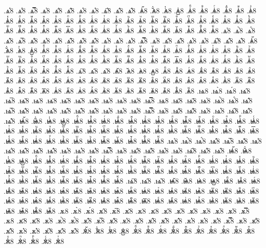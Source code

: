 {.ѧ҅̔8
.ѧ҅̾8
.ѧ҅̿8
.ѧ҅͘8
.ѧ҅҃8
.ѧ҅҄8
.ѧ҅҅8
.ѧ҅҆8
.ѧ҅҇8
.ѧ҅᷀8
.ѧ҅᷁8
.ѧ҅᷶8
.ѧ᷷҅8
.ѧ᷸҅8
.ѧ᷹҅8
.ѧ҅ⷠ8
.ѧ҅ⷡ8
.ѧ҅ⷢ8
.ѧ҅ⷣ8
.ѧ҅ⷤ8
.ѧ҅ⷥ8
.ѧ҅ⷦ8
.ѧ҅ⷧ8
.ѧ҅ⷨ8
.ѧ҅ⷩ8
.ѧ҅ⷪ8
.ѧ҅ⷫ8
.ѧ҅ⷬ8
.ѧ҅ⷭ8
.ѧ҅ⷮ8
.ѧ҅ⷯ8
.ѧ҅ⷰ8
.ѧ҅ⷱ8
.ѧ҅ⷲ8
.ѧ҅ⷳ8
.ѧ҅ⷴ8
.ѧ҅ⷵ8
.ѧ҅ⷶ8
.ѧ҅ⷷ8
.ѧ҅ⷸ8
.ѧ҅ⷹ8
.ѧ҅ⷺ8
.ѧ҅ⷻ8
.ѧ҅ⷼ8
.ѧ҅ⷽ8
.ѧ҅ⷾ8
.ѧ҅ⷿ8
.ѧ҅꙯8
.ѧ҅ꙴ8
.ѧ҅ꙵ8
.ѧ҅ꙶ8
.ѧ҅ꙷ8
.ѧ҅ꙸ8
.ѧ҅ꙹ8
.ѧ҅ꙺ8
.ѧ҅ꙻ8
.ѧ҅꙼8
.ѧ҅꙽8
.ѧ҅ꚞ8
.ѧ҅ꚟ8
.ѧ҆8
.ѧ҆̀8
.ѧ҆́8
.ѧ҆̂8
.ѧ҆̅8
.ѧ҆̆8
.ѧ҆̇8
.ѧ҆̈8
.ѧ҆̋8
.ѧ҆̏8
.ѧ҆̑8
.ѧ҆̓8
.ѧ҆̔8
.ѧ҆̾8
.ѧ҆̿8
.ѧ҆͘8
.ѧ҆҃8
.ѧ҆҄8
.ѧ҆҅8
.ѧ҆҆8
.ѧ҆҇8
.ѧ҆᷀8
.ѧ҆᷁8
.ѧ҆᷶8
.ѧ᷷҆8
.ѧ᷸҆8
.ѧ᷹҆8
.ѧ҆ⷠ8
.ѧ҆ⷡ8
.ѧ҆ⷢ8
.ѧ҆ⷣ8
.ѧ҆ⷤ8
.ѧ҆ⷥ8
.ѧ҆ⷦ8
.ѧ҆ⷧ8
.ѧ҆ⷨ8
.ѧ҆ⷩ8
.ѧ҆ⷪ8
.ѧ҆ⷫ8
.ѧ҆ⷬ8
.ѧ҆ⷭ8
.ѧ҆ⷮ8
.ѧ҆ⷯ8
.ѧ҆ⷰ8
.ѧ҆ⷱ8
.ѧ҆ⷲ8
.ѧ҆ⷳ8
.ѧ҆ⷴ8
.ѧ҆ⷵ8
.ѧ҆ⷶ8
.ѧ҆ⷷ8
.ѧ҆ⷸ8
.ѧ҆ⷹ8
.ѧ҆ⷺ8
.ѧ҆ⷻ8
.ѧ҆ⷼ8
.ѧ҆ⷽ8
.ѧ҆ⷾ8
.ѧ҆ⷿ8
.ѧ҆꙯8
.ѧ҆ꙴ8
.ѧ҆ꙵ8
.ѧ҆ꙶ8
.ѧ҆ꙷ8
.ѧ҆ꙸ8
.ѧ҆ꙹ8
.ѧ҆ꙺ8
.ѧ҆ꙻ8
.ѧ҆꙼8
.ѧ҆꙽8
.ѧ҆ꚞ8
.ѧ҆ꚟ8
.ѧ҇8
.ѧ᷀8
.ѧ᷁8
.ѧ᷶8
.ѧ᷷8
.ѧ᷸8
.ѧ᷹8
.ѧⷠ8
.ѧⷡ8
.ѧⷢ8
.ѧⷣ8
.ѧⷤ8
.ѧⷥ8
.ѧⷦ8
.ѧⷧ8
.ѧⷨ8
.ѧⷩ8
.ѧⷪ8
.ѧⷫ8
.ѧⷬ8
.ѧⷭ8
.ѧⷮ8
.ѧⷯ8
.ѧⷰ8
.ѧⷱ8
.ѧⷲ8
.ѧⷳ8
.ѧⷴ8
.ѧⷵ8
.ѧⷶ8
.ѧⷷ8
.ѧⷸ8
.ѧⷹ8
.ѧⷺ8
.ѧⷻ8
.ѧⷼ8
.ѧⷽ8
.ѧⷾ8
.ѧⷿ8
.ѧ꙯8
.ѧꙴ8
.ѧꙵ8
.ѧꙶ8
.ѧꙷ8
.ѧꙸ8
.ѧꙹ8
.ѧꙺ8
.ѧꙻ8
.ѧ꙼8
.ѧ꙽8
.ѧꚞ8
.ѧꚟ8
.ѩ8
.ѩ̀8
.ѩ́8
.ѩ̂8
.ѩ̅8
.ѩ̆8
.ѩ̇8
.ѩ̈8
.ѩ̋8
.ѩ̏8
.ѩ̑8
.ѩ̓8
.ѩ̔8
.ѩ̾8
.ѩ̿8
.ѩ͘8
.ѩ҃8
.ѩ҄8
.ѩ҅8
.ѩ҅̀8
.ѩ҅́8
.ѩ҅̂8
.ѩ҅̅8
.ѩ҅̆8
.ѩ҅̇8
.ѩ҅̈8
.ѩ҅̋8
.ѩ҅̏8
.ѩ҅̑8
.ѩ҅̓8
.ѩ҅̔8
.ѩ҅̾8
.ѩ҅̿8
.ѩ҅͘8
.ѩ҅҃8
.ѩ҅҄8
.ѩ҅҅8
.ѩ҅҆8
.ѩ҅҇8
.ѩ҅᷀8
.ѩ҅᷁8
.ѩ҅᷶8
.ѩ᷷҅8
.ѩ᷸҅8
.ѩ᷹҅8
.ѩ҅ⷠ8
.ѩ҅ⷡ8
.ѩ҅ⷢ8
.ѩ҅ⷣ8
.ѩ҅ⷤ8
.ѩ҅ⷥ8
.ѩ҅ⷦ8
.ѩ҅ⷧ8
.ѩ҅ⷨ8
.ѩ҅ⷩ8
.ѩ҅ⷪ8
.ѩ҅ⷫ8
.ѩ҅ⷬ8
.ѩ҅ⷭ8
.ѩ҅ⷮ8
.ѩ҅ⷯ8
.ѩ҅ⷰ8
.ѩ҅ⷱ8
.ѩ҅ⷲ8
.ѩ҅ⷳ8
.ѩ҅ⷴ8
.ѩ҅ⷵ8
.ѩ҅ⷶ8
.ѩ҅ⷷ8
.ѩ҅ⷸ8
.ѩ҅ⷹ8
.ѩ҅ⷺ8
.ѩ҅ⷻ8
.ѩ҅ⷼ8
.ѩ҅ⷽ8
.ѩ҅ⷾ8
.ѩ҅ⷿ8
.ѩ҅꙯8
.ѩ҅ꙴ8
.ѩ҅ꙵ8
.ѩ҅ꙶ8
.ѩ҅ꙷ8
.ѩ҅ꙸ8
.ѩ҅ꙹ8
.ѩ҅ꙺ8
.ѩ҅ꙻ8
.ѩ҅꙼8
.ѩ҅꙽8
.ѩ҅ꚞ8
.ѩ҅ꚟ8
.ѩ҆8
.ѩ҆̀8
.ѩ҆́8
.ѩ҆̂8
.ѩ҆̅8
.ѩ҆̆8
.ѩ҆̇8
.ѩ҆̈8
.ѩ҆̋8
.ѩ҆̏8
.ѩ҆̑8
.ѩ҆̓8
.ѩ҆̔8
.ѩ҆̾8
.ѩ҆̿8
.ѩ҆͘8
.ѩ҆҃8
.ѩ҆҄8
.ѩ҆҅8
.ѩ҆҆8
.ѩ҆҇8
.ѩ҆᷀8
.ѩ҆᷁8
.ѩ҆᷶8
.ѩ᷷҆8
.ѩ᷸҆8
.ѩ᷹҆8
.ѩ҆ⷠ8
.ѩ҆ⷡ8
.ѩ҆ⷢ8
.ѩ҆ⷣ8
.ѩ҆ⷤ8
.ѩ҆ⷥ8
.ѩ҆ⷦ8
.ѩ҆ⷧ8
.ѩ҆ⷨ8
.ѩ҆ⷩ8
.ѩ҆ⷪ8
.ѩ҆ⷫ8
.ѩ҆ⷬ8
.ѩ҆ⷭ8
.ѩ҆ⷮ8
.ѩ҆ⷯ8
.ѩ҆ⷰ8
.ѩ҆ⷱ8
.ѩ҆ⷲ8
.ѩ҆ⷳ8
.ѩ҆ⷴ8
.ѩ҆ⷵ8
.ѩ҆ⷶ8
.ѩ҆ⷷ8
.ѩ҆ⷸ8
.ѩ҆ⷹ8
.ѩ҆ⷺ8
.ѩ҆ⷻ8
.ѩ҆ⷼ8
.ѩ҆ⷽ8
.ѩ҆ⷾ8
.ѩ҆ⷿ8
.ѩ҆꙯8
.ѩ҆ꙴ8
.ѩ҆ꙵ8
.ѩ҆ꙶ8
.ѩ҆ꙷ8
.ѩ҆ꙸ8
.ѩ҆ꙹ8
.ѩ҆ꙺ8
.ѩ҆ꙻ8
.ѩ҆꙼8
.ѩ҆꙽8
.ѩ҆ꚞ8
.ѩ҆ꚟ8
.ѩ҇8
.ѩ᷀8
.ѩ᷁8
.ѩ᷶8
.ѩ᷷8
.ѩ᷸8
.ѩ᷹8
.ѩⷠ8
.ѩⷡ8
.ѩⷢ8
.ѩⷣ8
.ѩⷤ8
.ѩⷥ8
.ѩⷦ8
.ѩⷧ8
.ѩⷨ8
.ѩⷩ8
.ѩⷪ8
.ѩⷫ8
.ѩⷬ8
.ѩⷭ8
.ѩⷮ8
.ѩⷯ8
.ѩⷰ8
.ѩⷱ8
.ѩⷲ8
.ѩⷳ8
.ѩⷴ8
.ѩⷵ8
.ѩⷶ8
.ѩⷷ8
.ѩⷸ8
.ѩⷹ8
.ѩⷺ8
.ѩⷻ8
.ѩⷼ8
.ѩⷽ8
.ѩⷾ8
.ѩⷿ8
.ѩ꙯8
.ѩꙴ8
.ѩꙵ8
.ѩꙶ8
.ѩꙷ8
.ѩꙸ8
.ѩꙹ8
.ѩꙺ8
.ѩꙻ8
.ѩ꙼8
.ѩ꙽8
.ѩꚞ8
.ѩꚟ8
.ѫ8
.ѫ̀8
.ѫ́8
.ѫ̂8
.ѫ̅8
.ѫ̆8
.ѫ̇8
.ѫ̈8
.ѫ̋8
.ѫ̏8
.ѫ̑8
.ѫ̓8
.ѫ̔8
.ѫ̾8
.ѫ̿8
.ѫ͘8
.ѫ҃8
.ѫ҄8
.ѫ҅8
.ѫ҅̀8
.ѫ҅́8
.ѫ҅̂8
.ѫ҅̅8
.ѫ҅̆8
.ѫ҅̇8
.ѫ҅̈8
.ѫ҅̋8
.ѫ҅̏8
.ѫ҅̑8
.ѫ҅̓8
.ѫ҅̔8
.ѫ҅̾8
.ѫ҅̿8
.ѫ҅͘8
.ѫ҅҃8
.ѫ҅҄8
.ѫ҅҅8
.ѫ҅҆8
.ѫ҅҇8
.ѫ҅᷀8
.ѫ҅᷁8
.ѫ҅᷶8
.ѫ᷷҅8
.ѫ᷸҅8
.ѫ᷹҅8
.ѫ҅ⷠ8
.ѫ҅ⷡ8
.ѫ҅ⷢ8
.ѫ҅ⷣ8
.ѫ҅ⷤ8
.ѫ҅ⷥ8
.ѫ҅ⷦ8
.ѫ҅ⷧ8
.ѫ҅ⷨ8
.ѫ҅ⷩ8
.ѫ҅ⷪ8
.ѫ҅ⷫ8
.ѫ҅ⷬ8
.ѫ҅ⷭ8
.ѫ҅ⷮ8
}
